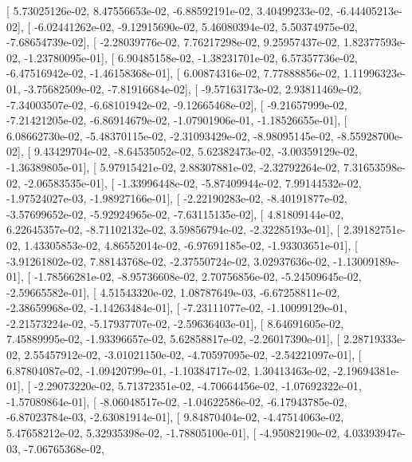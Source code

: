 \documentclass{article}
\begin{document}
       [  5.73025126e-02,   8.47556653e-02,  -6.88592191e-02,
          3.40499233e-02,  -6.44405213e-02],
       [ -6.02441262e-02,  -9.12915690e-02,   5.46080394e-02,
          5.50374975e-02,  -7.68654739e-02],
       [ -2.28039776e-02,   7.76217298e-02,   9.25957437e-02,
          1.82377593e-02,  -1.23780095e-01],
       [  6.90485158e-02,  -1.38231701e-02,   6.57357736e-02,
         -6.47516942e-02,  -1.46158368e-01],
       [  6.00874316e-02,   7.77888856e-02,   1.11996323e-01,
         -3.75682509e-02,  -7.81916684e-02],
       [ -9.57163173e-02,   2.93811469e-02,  -7.34003507e-02,
         -6.68101942e-02,  -9.12665468e-02],
       [ -9.21657999e-02,  -7.21421205e-02,  -6.86914679e-02,
         -1.07901906e-01,  -1.18526655e-01],
       [  6.08662730e-02,  -5.48370115e-02,  -2.31093429e-02,
         -8.98095145e-02,  -8.55928700e-02],
       [  9.43429704e-02,  -8.64535052e-02,   5.62382473e-02,
         -3.00359129e-02,  -1.36389805e-01],
       [  5.97915421e-02,   2.88307881e-02,  -2.32792264e-02,
          7.31653598e-02,  -2.06583535e-01],
       [ -1.33996448e-02,  -5.87409944e-02,   7.99144532e-02,
         -1.97524027e-03,  -1.98927166e-01],
       [ -2.22190283e-02,  -8.40191877e-02,  -3.57699652e-02,
         -5.92924965e-02,  -7.63115135e-02],
       [  4.81809144e-02,   6.22645357e-02,  -8.71102132e-02,
          3.59856794e-02,  -2.32285193e-01],
       [  2.39182751e-02,   1.43305853e-02,   4.86552014e-02,
         -6.97691185e-02,  -1.93303651e-01],
       [ -3.91261802e-02,   7.88143768e-02,  -2.37550724e-02,
          3.02937636e-02,  -1.13009189e-01],
       [ -1.78566281e-02,  -8.95736608e-02,   2.70756856e-02,
         -5.24509645e-02,  -2.59665582e-01],
       [  4.51543320e-02,   1.08787649e-03,  -6.67258811e-02,
         -2.38659968e-02,  -1.14263484e-01],
       [ -7.23111077e-02,  -1.10099129e-01,  -2.21573224e-02,
         -5.17937707e-02,  -2.59636403e-01],
       [  8.64691605e-02,   7.45889995e-02,  -1.93396657e-02,
          5.62858817e-02,  -2.26017390e-01],
       [  2.28719333e-02,   2.55457912e-02,  -3.01021150e-02,
         -4.70597095e-02,  -2.54221097e-01],
       [  6.87804087e-02,  -1.09420799e-01,  -1.10384717e-02,
          1.30413463e-02,  -2.19694381e-01],
       [ -2.29073220e-02,   5.71372351e-02,  -4.70664456e-02,
         -1.07692322e-01,  -1.57089864e-01],
       [ -8.06048517e-02,  -1.04622586e-02,  -6.17943785e-02,
         -6.87023784e-03,  -2.63081914e-01],
       [  9.84870404e-02,  -4.47514063e-02,   5.47658212e-02,
          5.32935398e-02,  -1.78805100e-01],
       [ -4.95082190e-02,   4.03393947e-03,  -7.06765368e-02,
\end{document}
